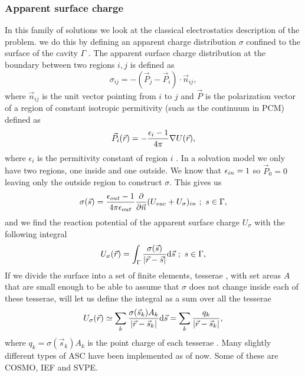 \documentclass[../Thesis.tex]{subfiles}
\begin{document}
\subsubsection{Apparent surface charge}
In this family of solutions we look at the classical electrostatics description
of the problem. we do this by defining an apparent charge distribution
$\sigma$ confined to the surface of the cavity $\Gamma$ \cite{Tomasi:1994wt, Tomasi:2005ipa}.
The apparent surface charge distribution at the boundary between two regions $i, j$
is defined as
\begin{equation}
  \sigma_{ij} = -(\vec{P}_j - \vec{P}_i)\cdot\vec{n}_{ij},
\end{equation}
where $\vec{n}_{ij}$ is the unit vector pointing from $i$ to $j$ and $\vec{P}$ is
the polarization vector of a region of constant isotropic permitivity (such as
the continuum in \ac{PCM}) defined as
\begin{equation}
  \vec{P}_i (\vec{r}) = - \frac{\epsilon_i - 1}{4\pi}\nabla U(\vec{r}),
\end{equation}
where $\epsilon_i$ is the permitivity constant of region $i$ \cite{Tomasi:2005ipa}.
In a solvation model we only have two regions, one inside and one outside. We
know that $\epsilon_{in} = 1$ so $\vec{P}_0 = 0$ leaving only the outside region to
construct $\sigma$. This gives us \cite{Tomasi:2005ipa}
\begin{equation}\label{eq:asc}
  \sigma(\vec{s}) =\frac{\epsilon_{out} - 1}{4\pi\epsilon_{out}} \frac{\partial}{\partial\vec{n}} (U_{vac} + U_{\sigma})_{in}\ ;\ s \in \Gamma,
\end{equation}
and we find the reaction potential of the apparent surface charge $U_{\sigma}$
with the following integral
 \begin{equation}
   U_{\sigma}(\vec{r}) = \int_{\Gamma}\frac{\sigma(\vec{s})}{\abs{\vec{r} - \vec{s}}} \text{d}\vec{s}\ ;\ s \in \Gamma,
 \end{equation}
If we divide the surface into a set of finite elements, tesserae
\cite{Tomasi:2005ipa, Sorland}, with set areas $A$ that are small enough to be able
to assume that $\sigma$ does not change inside each of these tesserae, will let us define the integral
as a sum over all the tesserae
\begin{equation}
   U_{\sigma}(\vec{r}) \simeq \sum_k\frac{\sigma(\vec{s}_k) A_k}{\abs{\vec{r} - \vec{s}_k}} \text{d}\vec{s}
   = \sum_k\frac{q_k}{\abs{\vec{r} - \vec{s}_k}},
\end{equation}
where $q_k = \sigma(\vec{s}_k) A_k$ is the point charge of each tesserae
\cite{Tomasi:2005ipa}.
Many slightly different types of \ac{ASC} have been implemented as of now. Some of these
are \ac{COSMO}, \ac{IEF} and \ac{SVPE}.
\end{document}
